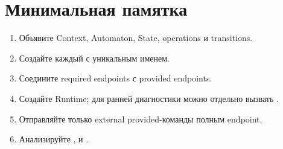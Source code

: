 \section{Минимальная памятка}

\begin{enumerate}
  \item Объявите Context, Automaton, State, operations и transitions.
  \item Создайте каждый  с уникальным именем.
  \item Соедините required endpoints с provided endpoints.
  \item Создайте Runtime; для ранней диагностики можно отдельно вызвать
    .
  \item Отправляйте только external provided-команды полным endpoint.
  \item Анализируйте ,  и .
\end{enumerate}

